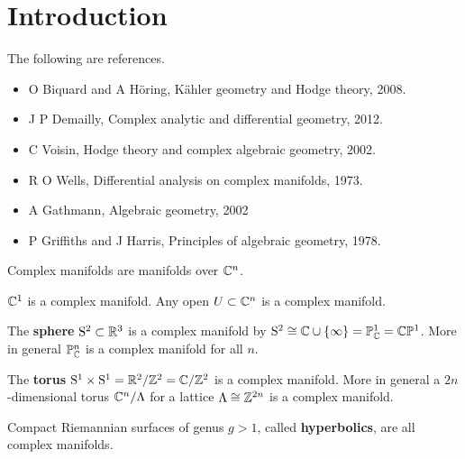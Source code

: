 





\setcounter{section}{0}

\section{Introduction}


The following are references.
\begin{itemize}
\item O Biquard and A H\"oring, K\"ahler geometry and Hodge theory, 2008.
\item J P Demailly, Complex analytic and differential geometry, 2012.
\item C Voisin, Hodge theory and complex algebraic geometry, 2002.
\item R O Wells, Differential analysis on complex manifolds, 1973.
\item A Gathmann, Algebraic geometry, 2002
\item P Griffiths and J Harris, Principles of algebraic geometry, 1978.
\end{itemize}

Complex manifolds are manifolds over $ \mathbb{C}^n $.

\begin{example}
$ \mathbb{C}^1 $ is a complex manifold. Any open $ U \subset \mathbb{C}^n $ is a complex manifold.
\end{example}

\begin{example}
The \textbf{sphere} $ \mathrm{S}^2 \subset \mathbb{R}^3 $ is a complex manifold by $ \S^2 \cong \CC \cup \cbr{\infty} = \PP_\CC^1 = \CC\PP^1 $. More in general $ \mathbb{P}_{\mathbb{C}}^n $ is a complex manifold for all $ n $.
\end{example}

\begin{example}
The \textbf{torus} $ \mathrm{S}^1 \times \mathrm{S}^1 = \mathbb{R}^2 / \mathbb{Z}^2 = \mathbb{C} / \mathbb{Z}^2 $ is a complex manifold. More in general a $ 2n $-dimensional torus $ \mathbb{C}^n / \Lambda $ for a lattice $ \Lambda \cong \mathbb{Z}^{2n} $ is a complex manifold.
\end{example}

\begin{example}
Compact Riemannian surfaces of genus $ g > 1 $, called \textbf{hyperbolics}, are all complex manifolds.
\end{example}

